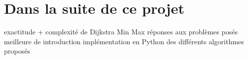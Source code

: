 
\section{Dans la suite de ce projet}

exactitude + complexité de Dijkstra Min Max
réponses aux problèmes posés
meilleure de introduction
implémentation en Python des différents algorithmes proposés 